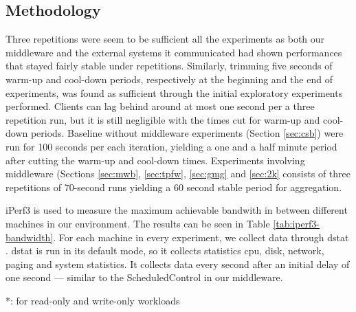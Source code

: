 \documentclass[11pt,a4paper]{article}
\begin{document}
\subsection{Methodology} \label{sec:ov-methodology}
\par Three repetitions were seem to be sufficient all the experiments as both our middleware and the external systems it communicated had shown performances that stayed fairly stable under repetitions. Similarly, trimming five seconds of warm-up and cool-down periods, respectively at the beginning and the end of experiments, was found as sufficient through the initial exploratory experiments performed. Clients can lag behind around at most one second per a three repetition run, but it is still negligible with the times cut for warm-up and cool-down periods. Baseline without middleware experiments (Section \ref{sec:csb}) were run for 100 seconds per each iteration, yielding a one and a half minute period after cutting the warm-up and cool-down times. Experiments involving middleware (Sections \ref{sec:mwb}, \ref{sec:tpfw}, \ref{sec:gmg} and \ref{sec:2k} consists of three repetitions of 70-second runs yielding a 60 second stable period for aggregation.
\par iPerf3 \cite{iperf} is used to measure the maximum achievable bandwith in between different machines in our environment. The results can be seen in Table \ref{tab:iperf3-bandwidth}. For each machine in every experiment, we collect data through dstat \cite{dstat}. dstat is run in its default mode, so it collects statistics cpu, disk, network, paging and system  statistics. It collects data every second after an initial delay of one second — similar to the ScheduledControl in our middleware.
\begin{table}[h]
\small
\centering
{}
{*: for read-only and write-only workloads}
\caption{Maximum achievable bandwidth values for all machines, obtained using iperf3. So-called ``effective bandwidth'' is the maximum bandwidth a machine can utilize only with the set queries or get replies. It is an informal measure that comes as useful while analyzing read-only and write-only workloads in later sections.} \label{tab:iperf3-bandwidth}
\end{table}
\end{document}
